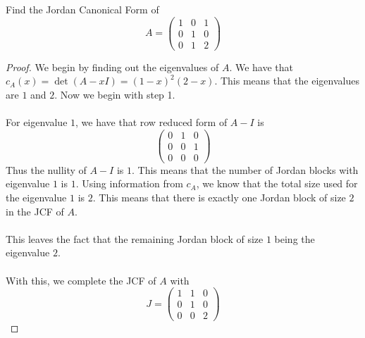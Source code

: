 \begin{eg}{}{} Find the Jordan Canonical Form of $$A=\begin{pmatrix}
1 & 0 & 1\\
0 & 1 & 0\\
0 & 1 & 2
\end{pmatrix}$$ \tcbline
\begin{proof}
We begin by finding out the eigenvalues of $A$. We have that $c_A(x)=\det(A-xI)=(1-x)^2(2-x)$. This means that the eigenvalues are $1$ and $2$. Now we begin with step 1. \\~\\
For eigenvalue $1$, we have that row reduced form of $A-I$ is $$\begin{pmatrix}
0 & 1 & 0\\
0 & 0 & 1\\
0 & 0 & 0
\end{pmatrix}$$
Thus the nullity of $A-I$ is $1$. This means that the number of Jordan blocks with eigenvalue $1$ is $1$. Using information from $c_A$, we know that the total size used for the eigenvalue $1$ is $2$. This means that there is exactly one Jordan block of size $2$ in the JCF of $A$. \\~\\
This leaves the fact that the remaining Jordan block of size $1$ being the eigenvalue $2$. \\~\\
With this, we complete the JCF of $A$ with $$J=\begin{pmatrix}
1 & 1 & 0\\
0 & 1 & 0\\
0 & 0 & 2
\end{pmatrix}$$


\end{proof}
\end{eg}

